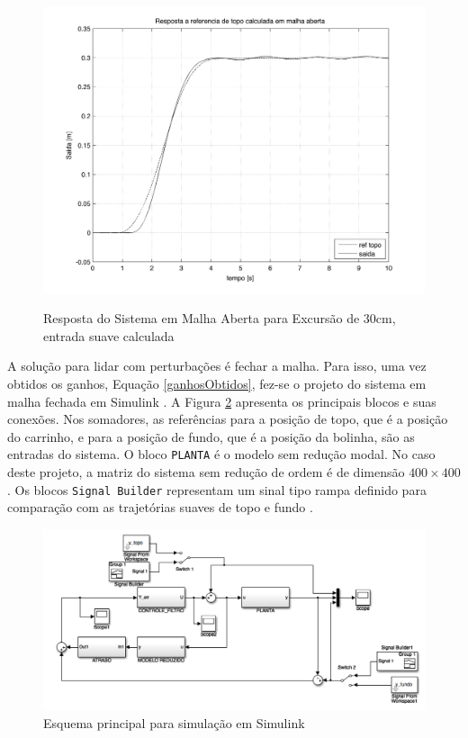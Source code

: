 \begin{figure}[!htb]
\begin{minipage}{0.45\textwidth}
        \includegraphics[width=1\linewidth]{figs/resultados/simulacao/respostaMalhaAbertaRefTopo}
        \label{respostaMalhaAbertaEntradaSuave}
        \caption{Resposta do Sistema em Malha Aberta para Excursão de 30cm, entrada suave calculada}
    \end{minipage}
\end{figure}

 A solução para lidar com perturbações é fechar a malha. Para isso, uma vez obtidos os ganhos, Equação \ref{ganhosObtidos}, fez-se o projeto do sistema em malha fechada em Simulink \cite{simulink}. A Figura \ref{topModel} apresenta os principais blocos e suas conexões. Nos somadores, as referências para a posição de topo, que é a posição do carrinho, e para a posição de fundo, que é a posição da bolinha, são as entradas do sistema. O bloco \texttt{PLANTA} é o modelo sem redução modal. No caso deste projeto, a matriz do sistema sem redução de ordem é de dimensão $400\times 400$. Os blocos \texttt{Signal Builder} representam um sinal tipo rampa definido para comparação com as trajetórias suaves de topo e fundo \cite{rafaelMestrado}. 
 

\begin{figure}[!ht]
\centering

\includegraphics[width=0.9\linewidth]{figs/resultados/simulink/top}
\caption{Esquema principal para simulação em Simulink\label{topModel}}
\end{figure}

